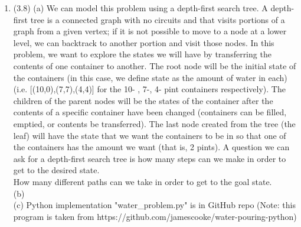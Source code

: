 \documentclass{article}
\begin{document}
\begin{enumerate}
		\item
			(3.8) (a) We can model this problem using a depth-first search tree. A depth-first tree is a connected graph with no circuits and that visits portions of a graph from a given vertex; if it is not possible to move to a node at a lower level, we can backtrack to another portion and visit those nodes. In this problem, we want to explore the states we will have by transferring the contents of one container to another. The root node will be the initial state of the containers (in this case, we define state as the amount of water in each) (i.e. [(10,0),(7,7),(4,4)] for the 10- , 7-, 4- pint containers respectively). The children of the parent nodes will be the states of the container after the contents of a specific container have been changed (containers can be filled, emptied, or contents be transferred). The last node created from the tree (the leaf) will have the state that we want the containers to be in so that one of the containers has the amount we want (that is, 2 pints). A question we can ask for a depth-first search tree is how many steps can we make in order to get to the desired state.\\ How many different paths can we take in order to get to the goal state.\\
			(b) \\
			(c) Python implementation "water\_problem.py" is in GitHub repo (Note: this program is taken from https://github.com/jamescooke/water-pouring-python)\\
			\\

	\end{enumerate}
\end{document}
